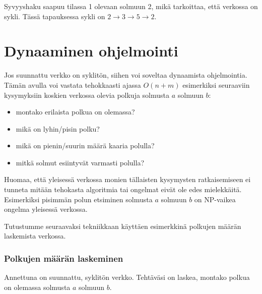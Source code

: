 Syvyyshaku saapuu tilassa 1 olevaan solmuun 2,
mikä tarkoittaa, että verkossa on sykli.
Tässä tapauksessa sykli on $2 \rightarrow 3 \rightarrow 5 \rightarrow 2$.

\section{Dynaaminen ohjelmointi}

Jos suunnattu verkko on syklitön,
siihen voi soveltaa dynaamista ohjelmointia.
Tämän avulla voi vastata tehokkaasti
ajassa $O(n+m)$ esimerkiksi seuraaviin
kysymyksiin koskien verkossa olevia polkuja solmusta $a$ solmuun $b$:

\begin{itemize}
\item montako erilaista polkua on olemassa?
\item mikä on lyhin/pisin polku?
\item mikä on pienin/suurin määrä kaaria polulla?
\item mitkä solmut esiintyvät varmasti polulla?
\end{itemize}

Huomaa, että yleisessä verkossa
monien tällaisten kysymysten ratkaisemiseen
ei tunneta mitään tehokasta algoritmia
tai ongelmat eivät ole edes mielekkäitä.
Esimerkiksi pisimmän polun etsiminen
solmusta $a$ solmuun $b$ on NP-vaikea ongelma
yleisessä verkossa.

Tutustumme seuraavaksi tekniikkaan käyttäen
esimerkkinä polkujen määrän laskemista verkossa.

\subsubsection{Polkujen määrän laskeminen}

\begin{task}
Annettuna on suunnattu, syklitön verkko.
Tehtäväsi on laskea, montako polkua on olemassa
solmusta $a$ solmuun $b$.
\end{task}

